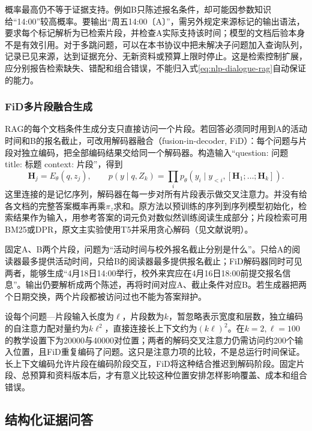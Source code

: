 概率最高仍不等于证据支持。例如B只陈述报名条件，却可能因参数知识给“14:00”较高概率。要输出“周五14:00〔A〕”，需另外规定来源标记的输出语法，要求每个标记解析为已检索片段，并检查A实际支持该时间；模型的文档后验本身不是有效引用。对于多跳问题，可以在本书协议中把未解决子问题加入查询队列，记录已见来源，达到证据充分、无新资料或预算上限时停止。这是检索控制扩展，应分别报告检索缺失、错配和组合错误，不能归入式\eqref{eq:nlp-dialogue-rag}自动保证的能力。

\subsubsection{FiD多片段融合生成}
\label{sec:nlp-dialogue-fid}

RAG的每个文档条件生成分支只直接访问一个片段。若回答必须同时用到A的活动时间和B的报名截止，可改用解码器融合（fusion-in-decoder, FiD）：每个问题与片段对独立编码，把全部编码结果交给同一个解码器。构造输入“question: 问题 title: 标题 context: 片段”，得到
\begin{equation}
 \bm{H}_j=E_\theta(q,z_j),\qquad
 p(y\mid q,Z_k)=
 \prod_i p_\theta(y_i\mid y_{<i},[\bm{H}_1;\ldots;\bm{H}_k]).
 \label{eq:nlp-dialogue-fid}
\end{equation}
这里连接的是记忆序列，解码器在每一步对所有片段表示做交叉注意力。并没有给各文档的完整答案概率再乘$\pi_z$求和。原方法以预训练的序列到序列模型初始化，检索结果作为输入，用参考答案的词元负对数似然训练阅读生成部分；片段检索可用BM25或DPR，原文主实验使用T5并采用贪心解码（见文献说明）。

固定A、B两个片段，问题为“活动时间与校外报名截止分别是什么”。只给A的阅读器最多提供活动时间，只给B的阅读器最多提供报名截止；FiD解码器同时可见两者，能够生成“4月18日14:00举行，校外来宾应在4月16日18:00前提交报名信息”。输出仍要解析成两个陈述，再将时间对应A、截止条件对应B。若生成器把两个日期交换，两个片段都被访问过也不能为答案辩护。

设每个问题—片段输入长度为$\ell$，片段数为$k$，暂忽略表示宽度和层数，独立编码的自注意力配对量约为$k\ell^2$，直接连接长上下文约为$(k\ell)^2$。在$k=2,\ell=100$的教学设置下为20000与40000对位置；两者的解码交叉注意力仍需访问约200个输入位置，且FiD重复编码了问题。这只是注意力项的比较，不是总运行时间保证。长上下文编码允许片段在编码阶段交互，FiD将这种结合推迟到解码阶段。固定片段、总预算和资料版本后，才有意义比较这种位置安排怎样影响覆盖、成本和组合错误。

\subsection{结构化证据问答}
\label{sec:nlp-dialogue-structured-qa}

